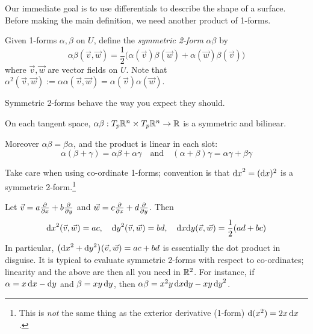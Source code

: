 Our immediate goal is to use differentials to describe the shape of a surface. Before making the main definition, we need  another product of 1-forms.

\begin{defn}{}{}
Given 1-forms $\alpha,\beta$ on $U$, define the \emph{symmetric 2-form} $\alpha\beta$ by
\[\alpha\beta(\vec v,\vec w)=\frac{1}{2}\bigl(\alpha(\vec v)\beta(\vec w)+\alpha(\vec w)\beta(\vec v)\bigr)\]
where $\vec v,\vec w$ are vector fields on $U$. Note that $\alpha^2(\vec v,\vec w):=\alpha\alpha(\vec v,\vec w)=\alpha(\vec v)\alpha(\vec w)$.
\end{defn}

Symmetric 2-forms behave the way you expect they should.

\begin{lemm}{}{}
On each tangent space, $\alpha\beta:T_p\mathbb{R}^n\times T_p\mathbb{R}^n\to\mathbb{R}$ is a symmetric and bilinear.\par
Moreover $\alpha\beta=\beta\alpha$, and the product is linear in each slot:
\[\alpha(\beta+\gamma)=\alpha\beta+\alpha\gamma\quad\text{and}\quad (\alpha+\beta)\gamma=\alpha\gamma+\beta\gamma\]
\end{lemm}


Take care when using co-ordinate 1-forms; convention is that ${\mathrm{d} x}^2=({\mathrm{d} x})^2$ is a symmetric 2-form.\footnote{This is \emph{not} the same thing as the exterior derivative (1-form) $\mathrm{d}(x^2)=2x\,{\mathrm{d} x}$.}

\begin{example}{}{}
Let $\vec v=a\frac{\partial }{\partial x}+b\frac{\partial }{\partial y}$ and $\vec w=c\frac{\partial }{\partial x}+d\frac{\partial }{\partial y}$. Then
\[{\mathrm{d} x}^2(\vec v,\vec w)=ac,\quad {\mathrm{d}y}^2(\vec v,\vec w)=bd,\quad {\mathrm{d}x}{\mathrm{d}y}(\vec v,\vec w)=\frac 12(ad+bc)\]
In particular, $\bigl({\mathrm{d} x}^2+{\mathrm{d} y}^2\bigr)(\vec v,\vec w)=ac+bd$ is essentially the dot product in disguise.\smallbreak
It is typical to evaluate symmetric 2-forms with respect to co-ordinates; linearity and the above are then all you need in $\mathbb{R}^2$. For instance, if $\alpha =x\,{\mathrm{d} x}-{\mathrm{d} y}$ and $\beta =xy\,{\mathrm{d} y}$, then $\alpha\beta=x^2y\,{\mathrm{d} x}{\mathrm{d} y}-xy\,{\mathrm{d} y}^2$.
\end{example}

